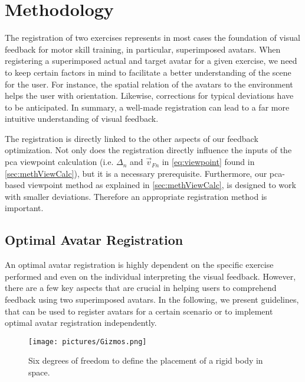 \section{Methodology \label{sec:methReg}}
The registration of two exercises represents in most cases the foundation of visual feedback for motor skill training, in particular, superimposed avatars. When registering a superimposed actual and target avatar for a given exercise, we need to keep certain factors in mind to facilitate a better understanding of the scene for the user. For instance, the spatial relation of the avatars to the environment helps the user with orientation. Likewise, corrections for typical deviations have to be anticipated. In summary, a well-made registration can lead to a far more intuitive understanding of visual feedback.

The registration is directly linked to the other aspects of our feedback optimization. Not only does the registration directly influence the inputs of the \acrfull{pca} viewpoint calculation (i.e. $\Delta_n$ and  $\vec{v}_{Fn}$ in \autoref{eq:viewpoint} found in \autoref{sec:methViewCalc}), but it is a necessary prerequisite. Furthermore, our \acrshort{pca}-based viewpoint method as explained in \autoref{sec:methViewCalc}, is designed to work with smaller deviations. Therefore an appropriate registration method is important.

\subsection*{Optimal Avatar Registration \label{sec:optimalReg}}
An optimal avatar registration is highly dependent on the specific exercise performed and even on the individual interpreting the visual feedback. However, there are a few key aspects that are crucial in helping users to comprehend feedback using two superimposed avatars. In the following, we present guidelines, that can be used to register avatars for a certain scenario or to implement optimal avatar registration independently.

\begin{figure}[h]
	\centering
	\texttt{[image: pictures/Gizmos.png]}
	\caption{Six degrees of freedom to define the placement of a rigid body in space.}
	\label{fig:6dof}
\end{figure}

